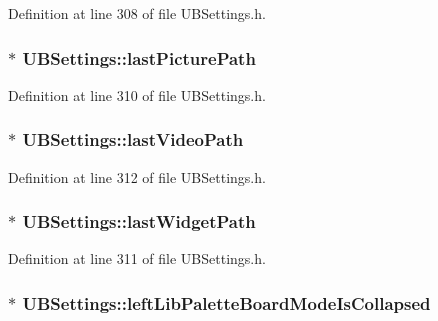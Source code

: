 Definition at line 308 of file U\-B\-Settings.\-h.

\hypertarget{class_u_b_settings_a521b887a58000c11bcac7b0d85b5ba95}{
\subsubsection[{last\-Picture\-Path}]{$\ast$ U\-B\-Settings\-::last\-Picture\-Path}}\label{db/d66/class_u_b_settings_a521b887a58000c11bcac7b0d85b5ba95}


Definition at line 310 of file U\-B\-Settings.\-h.

\hypertarget{class_u_b_settings_a650971fad41bf8076bd00d678c30c616}{
\subsubsection[{last\-Video\-Path}]{$\ast$ U\-B\-Settings\-::last\-Video\-Path}}\label{db/d66/class_u_b_settings_a650971fad41bf8076bd00d678c30c616}


Definition at line 312 of file U\-B\-Settings.\-h.

\hypertarget{class_u_b_settings_ad2545490b7627629f168dc9cf7f253d2}{
\subsubsection[{last\-Widget\-Path}]{$\ast$ U\-B\-Settings\-::last\-Widget\-Path}}\label{db/d66/class_u_b_settings_ad2545490b7627629f168dc9cf7f253d2}


Definition at line 311 of file U\-B\-Settings.\-h.

\hypertarget{class_u_b_settings_aeb42e33f2607503868c84c3d98e4c02c}{
\subsubsection[{left\-Lib\-Palette\-Board\-Mode\-Is\-Collapsed}]{$\ast$ U\-B\-Settings\-::left\-Lib\-Palette\-Board\-Mode\-Is\-Collapsed}}\label{db/d66/class_u_b_settings_aeb42e33f2607503868c84c3d98e4c02c}


